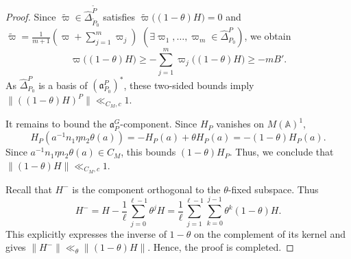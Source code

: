 \documentclass[12pt]{amsart}
\theoremstyle{definition}
\theoremstyle{plain}
\theoremstyle{remark}
\def\A{\mathbb{A}}%
\newcommand{\fa}{\mathfrak{a}}
\numberwithin{equation}{section}
\newcommand{\tP}{\widetilde{P}}
\newcommand{\tvarpi}{\widetilde{\varpi}}
\begin{document}
\begin{proof}
Since $\tvarpi\in \widehat\Delta_{\tP_0}^{\tP}$ satisfies $\tvarpi\bigl((1-\theta)H\bigr)=0$ and $\tvarpi=\frac{1}{m+1}(\varpi+\sum_{j=1}^m \varpi_j)$ $(\exists\varpi_1,\dots,\varpi_m\in \widehat\Delta_{P_0}^P)$, we obtain 
\[
\varpi\bigl((1-\theta)H\bigr)\ge -\sum_{j=1}^m \varpi_j\bigl((1-\theta)H\bigr)\ge -m B'.
\]
As $\widehat\Delta_{P_0}^P$ is a basis of
$(\fa_{P_0}^P)^*$, these two-sided bounds imply $\bigl\|((1-\theta)H)^P\bigr\|\ll_{C_M,c}1$. 


It remains to bound the $\fa_P^G$-component. 
Since $H_P$ vanishes on $M(\A)^1$, 
\[
  H_P(a^{-1}n_1\eta n_2\theta(a))=-H_P(a)+\theta H_P(a)=-(1-\theta)H_P(a).
\]
Since $a^{-1}n_1\eta n_2\theta(a)\in C_M$, this bounds $(1-\theta)H_P$.
Thus, we conclude that $\|(1-\theta)H\|\ll_{C_M,c}1$.


Recall that $H^-$ is the component orthogonal
to the $\theta$-fixed subspace. Thus
\[
  H^-=H-\frac1\ell\sum_{j=0}^{\ell-1}\theta^jH
      =\frac1\ell\sum_{j=1}^{\ell-1}
         \sum_{k=0}^{j-1}\theta^k(1-\theta)H.
\]
This explicitly expresses the inverse of $1-\theta$ on the
complement of its kernel and gives
$\|H^-\|\ll_\theta\|(1-\theta)H\|$.
Hence, the proof is completed. 
\end{proof}
\end{document}
